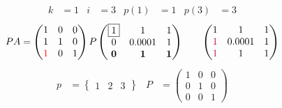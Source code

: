 \documentclass[pdf]{beamer}
\begin{document}
\begin{frame}{}\begin{align*} k &= 1 & i &= 3 & p(1) &= 1 & p(3) &= 3\end{align*}$$PA=\begin{pmatrix}1&0&0\\1&1&0\\{\color{red}1}&0&1\end{pmatrix} P \begin{pmatrix}\boxed{1}&1&1\\0&0.0001&1\\\mathbf{0}&\mathbf{1}&\mathbf{1}\end{pmatrix} \quad\quad \begin{pmatrix}1&1&1\\{\color{purple}1}&0.0001&1\\{\color{purple}1}&1&1\end{pmatrix}$$\begin{align*} p&= \begin{Bmatrix}1&2&3\end{Bmatrix} & P&= \begin{pmatrix}1&0&0\\0&1&0\\0&0&1\end{pmatrix} \end{align*}\end{frame}
\end{document}
